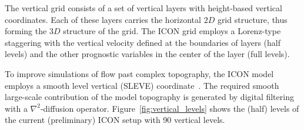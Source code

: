The vertical grid consists of a set of vertical layers with height-based vertical coordinates.
Each of these layers carries the horizontal $2D$ grid structure, thus forming the $3D$ structure of the grid.
The ICON grid employs a Lorenz-type staggering with the vertical velocity defined at the boundaries of layers (half levels) 
and the other prognostic variables in the center of the layer (full levels).

To improve simulations of flow past complex topography, the ICON model employs a smooth level vertical (SLEVE) coordinate~\citet*{Leuenberger2010}.
The required smooth large-scale contribution of the model topography is generated by digital filtering with a $\nabla^2$-diffusion operator.
Figure~\ref{fig:vertical_levels} shows the (half) levels of the current (preliminary) ICON setup with 90 vertical levels.



